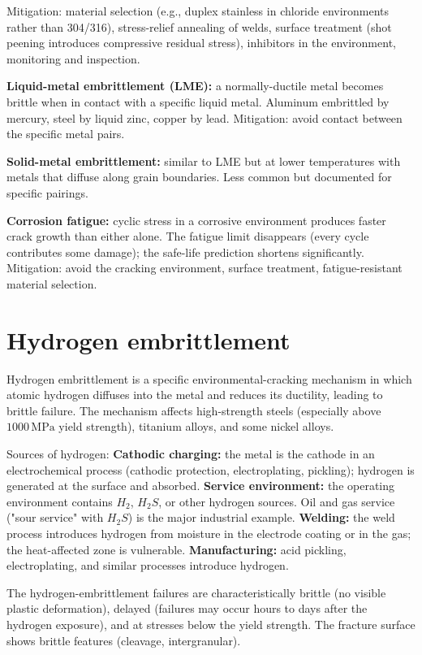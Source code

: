 Mitigation: material selection (e.g., duplex stainless in chloride environments rather than 304/316), stress-relief annealing of welds, surface treatment (shot peening introduces compressive residual stress), inhibitors in the environment, monitoring and inspection.

\textbf{Liquid-metal embrittlement (LME):} a normally-ductile metal becomes brittle when in contact with a specific liquid metal. Aluminum embrittled by mercury, steel by liquid zinc, copper by lead. Mitigation: avoid contact between the specific metal pairs.

\textbf{Solid-metal embrittlement:} similar to LME but at lower temperatures with metals that diffuse along grain boundaries. Less common but documented for specific pairings.

\textbf{Corrosion fatigue:} cyclic stress in a corrosive environment produces faster crack growth than either alone. The fatigue limit disappears (every cycle contributes some damage); the safe-life prediction shortens significantly. Mitigation: avoid the cracking environment, surface treatment, fatigue-resistant material selection.

\section{Hydrogen embrittlement}

Hydrogen embrittlement is a specific environmental-cracking mechanism in which atomic hydrogen diffuses into the metal and reduces its ductility, leading to brittle failure. The mechanism affects high-strength steels (especially above $1000\,\text{MPa}$ yield strength), titanium alloys, and some nickel alloys.

Sources of hydrogen:
\textbf{Cathodic charging:} the metal is the cathode in an electrochemical process (cathodic protection, electroplating, pickling); hydrogen is generated at the surface and absorbed.
\textbf{Service environment:} the operating environment contains $H_2$, $H_2S$, or other hydrogen sources. Oil and gas service ("sour service" with $H_2S$) is the major industrial example.
\textbf{Welding:} the weld process introduces hydrogen from moisture in the electrode coating or in the gas; the heat-affected zone is vulnerable.
\textbf{Manufacturing:} acid pickling, electroplating, and similar processes introduce hydrogen.

The hydrogen-embrittlement failures are characteristically brittle (no visible plastic deformation), delayed (failures may occur hours to days after the hydrogen exposure), and at stresses below the yield strength. The fracture surface shows brittle features (cleavage, intergranular).

